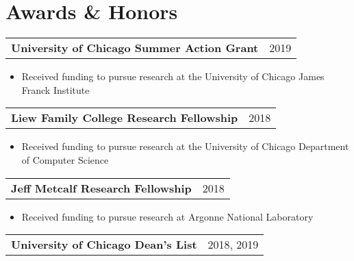 \documentclass[letterpaper, 12pt]{article}
\begin{document}
\section{Awards \& Honors}
\vspace{5pt}
\begin{tabular}{@{} L{12cm} @{} R{4.51cm} @{}}
  \textbf{University of Chicago Summer Action Grant} & 2019 \\
\end{tabular}
\vspace{-20pt}
\begin{itemize}
  \item Received funding to pursue research at the University of Chicago James Franck Institute
\end{itemize}

\begin{tabular}{@{} L{12cm} @{} R{4.51cm} @{}}
  \textbf{Liew Family College Research Fellowship} & 2018 \\
\end{tabular}
\vspace{-20pt}
\begin{itemize}
  \item Received funding to pursue research at the University of Chicago Department of Computer Science
\end{itemize}

\begin{tabular}{@{} L{12cm} @{} R{4.51cm} @{}}
  \textbf{Jeff Metcalf Research Fellowship} & 2018 \\
\end{tabular}
\vspace{-20pt}
\begin{itemize}
  \item Received funding to pursue research at Argonne National Laboratory
\end{itemize}

\begin{tabular}{@{} L{12cm} @{} R{4.51cm} @{}}
  \textbf{University of Chicago Dean's List} & 2018, 2019 \\
\end{tabular}
\vspace{5pt}

\pagebreak
\end{document}
